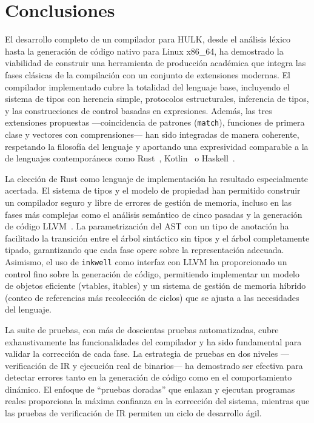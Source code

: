 \documentclass[12pt, a4paper]{article}
\begin{document}

\section{Conclusiones}
\label{sec:conclusiones}

El desarrollo completo de un compilador para HULK, desde el análisis léxico hasta la generación de código nativo para Linux x86\_64, ha demostrado la viabilidad de construir una herramienta de producción académica que integra las fases clásicas de la compilación con un conjunto de extensiones modernas. El compilador implementado cubre la totalidad del lenguaje base, incluyendo el sistema de tipos con herencia simple, protocolos estructurales, inferencia de tipos, y las construcciones de control basadas en expresiones. Además, las tres extensiones propuestas —coincidencia de patrones (\texttt{match}), funciones de primera clase y vectores con comprensiones— han sido integradas de manera coherente, respetando la filosofía del lenguaje y aportando una expresividad comparable a la de lenguajes contemporáneos como Rust~\cite{klabnik2019}, Kotlin~\cite{jemerov2017} o Haskell~\cite{marlow2010}.

La elección de Rust como lenguaje de implementación ha resultado especialmente acertada. El sistema de tipos y el modelo de propiedad han permitido construir un compilador seguro y libre de errores de gestión de memoria, incluso en las fases más complejas como el análisis semántico de cinco pasadas y la generación de código LLVM~\cite{lattner2004}. La parametrización del AST con un tipo de anotación ha facilitado la transición entre el árbol sintáctico sin tipos y el árbol completamente tipado, garantizando que cada fase opere sobre la representación adecuada. Asimismo, el uso de \texttt{inkwell} como interfaz con LLVM ha proporcionado un control fino sobre la generación de código, permitiendo implementar un modelo de objetos eficiente (vtables, itables) y un sistema de gestión de memoria híbrido (conteo de referencias más recolección de ciclos) que se ajusta a las necesidades del lenguaje.

La suite de pruebas, con más de doscientas pruebas automatizadas, cubre exhaustivamente las funcionalidades del compilador y ha sido fundamental para validar la corrección de cada fase. La estrategia de pruebas en dos niveles —verificación de IR y ejecución real de binarios— ha demostrado ser efectiva para detectar errores tanto en la generación de código como en el comportamiento dinámico. El enfoque de ``pruebas doradas'' que enlazan y ejecutan programas reales proporciona la máxima confianza en la corrección del sistema, mientras que las pruebas de verificación de IR permiten un ciclo de desarrollo ágil.
\end{document}
